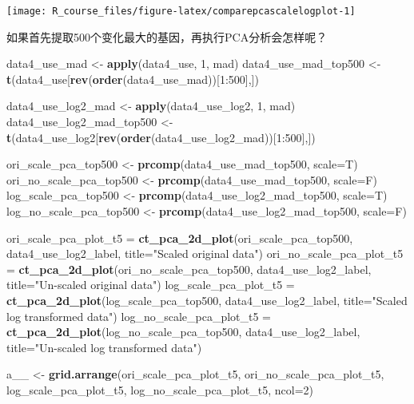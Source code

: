 \documentclass[]{article}
\newenvironment{Shaded}{\begin{snugshade}}{\end{snugshade}}
\newcommand{\KeywordTok}[1]{\textcolor[rgb]{0.13,0.29,0.53}{\textbf{{#1}}}}
\newcommand{\DataTypeTok}[1]{\textcolor[rgb]{0.13,0.29,0.53}{{#1}}}
\newcommand{\DecValTok}[1]{\textcolor[rgb]{0.00,0.00,0.81}{{#1}}}
\newcommand{\StringTok}[1]{\textcolor[rgb]{0.31,0.60,0.02}{{#1}}}
\newcommand{\NormalTok}[1]{{#1}}
\numberwithin{figure}{section}
\numberwithin{table}{section}
\theoremstyle{definition}
\theoremstyle{definition}
\theoremstyle{definition}
\theoremstyle{remark}
\begin{document}
\begin{center}\texttt{[image: R\_course\_files/figure-latex/comparepcascalelogplot-1]} \end{center}

如果首先提取500个变化最大的基因，再执行PCA分析会怎样呢？

\begin{Shaded}
\begin{Highlighting}[]
\NormalTok{data4_use_mad <-}\StringTok{ }\KeywordTok{apply}\NormalTok{(data4_use, }\DecValTok{1}\NormalTok{, mad)}
\NormalTok{data4_use_mad_top500 <-}\StringTok{ }\KeywordTok{t}\NormalTok{(data4_use[}\KeywordTok{rev}\NormalTok{(}\KeywordTok{order}\NormalTok{(data4_use_mad))[}\DecValTok{1}\NormalTok{:}\DecValTok{500}\NormalTok{],])}

\NormalTok{data4_use_log2_mad <-}\StringTok{ }\KeywordTok{apply}\NormalTok{(data4_use_log2, }\DecValTok{1}\NormalTok{, mad)}
\NormalTok{data4_use_log2_mad_top500 <-}\StringTok{ }\KeywordTok{t}\NormalTok{(data4_use_log2[}\KeywordTok{rev}\NormalTok{(}\KeywordTok{order}\NormalTok{(data4_use_log2_mad))[}\DecValTok{1}\NormalTok{:}\DecValTok{500}\NormalTok{],])}

\NormalTok{ori_scale_pca_top500 <-}\StringTok{ }\KeywordTok{prcomp}\NormalTok{(data4_use_mad_top500, }\DataTypeTok{scale=}\NormalTok{T)}
\NormalTok{ori_no_scale_pca_top500 <-}\StringTok{ }\KeywordTok{prcomp}\NormalTok{(data4_use_mad_top500, }\DataTypeTok{scale=}\NormalTok{F)}
\NormalTok{log_scale_pca_top500 <-}\StringTok{ }\KeywordTok{prcomp}\NormalTok{(data4_use_log2_mad_top500, }\DataTypeTok{scale=}\NormalTok{T)}
\NormalTok{log_no_scale_pca_top500 <-}\StringTok{ }\KeywordTok{prcomp}\NormalTok{(data4_use_log2_mad_top500, }\DataTypeTok{scale=}\NormalTok{F)}
\end{Highlighting}
\end{Shaded}

\begin{Shaded}
\begin{Highlighting}[]
\NormalTok{ori_scale_pca_plot_t5 =}\StringTok{ }\KeywordTok{ct_pca_2d_plot}\NormalTok{(ori_scale_pca_top500, data4_use_log2_label, }
        \DataTypeTok{title=}\StringTok{"Scaled original data"}\NormalTok{)}
\NormalTok{ori_no_scale_pca_plot_t5 =}\StringTok{ }\KeywordTok{ct_pca_2d_plot}\NormalTok{(ori_no_scale_pca_top500, }
        \NormalTok{data4_use_log2_label, }\DataTypeTok{title=}\StringTok{"Un-scaled original data"}\NormalTok{)}
\NormalTok{log_scale_pca_plot_t5 =}\StringTok{ }\KeywordTok{ct_pca_2d_plot}\NormalTok{(log_scale_pca_top500, }
        \NormalTok{data4_use_log2_label, }\DataTypeTok{title=}\StringTok{"Scaled log transformed data"}\NormalTok{)}
\NormalTok{log_no_scale_pca_plot_t5 =}\StringTok{ }\KeywordTok{ct_pca_2d_plot}\NormalTok{(log_no_scale_pca_top500, }
        \NormalTok{data4_use_log2_label, }\DataTypeTok{title=}\StringTok{"Un-scaled log transformed data"}\NormalTok{)}

\NormalTok{a__ <-}\StringTok{ }\KeywordTok{grid.arrange}\NormalTok{(ori_scale_pca_plot_t5, ori_no_scale_pca_plot_t5, }
                    \NormalTok{log_scale_pca_plot_t5, log_no_scale_pca_plot_t5, }\DataTypeTok{ncol=}\DecValTok{2}\NormalTok{)}
\end{Highlighting}
\end{Shaded}
\end{document}

